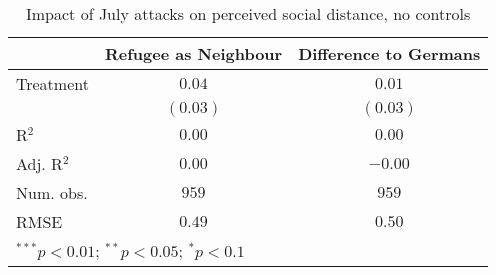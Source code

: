 
\begin{table}
\caption{Impact of July attacks on perceived social distance, no controls}
\begin{center}
\begin{tabular}{l c c}
\toprule
 & Refugee as Neighbour & Difference to Germans \\
\midrule
Treatment  & $0.04$   & $0.01$   \\
           & $(0.03)$ & $(0.03)$ \\
\midrule
R$^2$      & $0.00$   & $0.00$   \\
Adj. R$^2$ & $0.00$   & $-0.00$  \\
Num. obs.  & $959$    & $959$    \\
RMSE       & $0.49$   & $0.50$   \\
\bottomrule
\multicolumn{3}{l}{\scriptsize{$^{***}p<0.01$; $^{**}p<0.05$; $^{*}p<0.1$}}
\end{tabular}
\label{tab_dist_no_controls}
\end{center}
\end{table}
